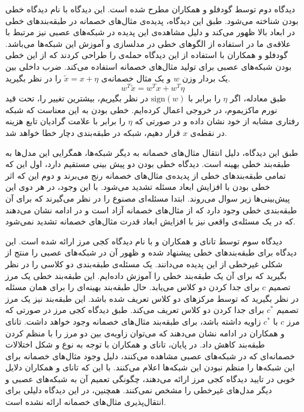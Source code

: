 \documentclass[12pt,onecolumn,a4paper]{article}
\begin{document}
دیدگاه دوم توسط گودفلو و همکاران\cite{goodfellow2014explaining}
مطرح شده است. این دیدگاه با نام دیدگاه خطی بودن شناخته می‌شود. طبق این دیدگاه، پدیده‌ی مثال‌های خصمانه در طبقه‌بندهای خطی در ابعاد بالا ظهور می‌کند و دلیل مشاهده‌ی این پدیده در شبکه‌های عصبی نیز مرتبط با علاقه‌ی ما در استفاده از الگوهای خطی در مدلسازی و آموزش این شبکه‌ها می‌باشد. گودفلو و همکاران با استفاده از این دیدگاه حمله‌ی
را طراحی کردند که از این خطی بودن شبکه‌های عصبی برای تولید مثال‌های خصمانه استفاده می‌کند. ضرب داخلی بین یک بردار وزن $w$ و یک مثال خصمانه‌ی $\tilde{x}=x+\eta$ را در نظر بگیرید.
\begin{equation*}
w^T\tilde{x}=w^Tx+w^T\eta
\end{equation*}
طبق معادله، اگر $\eta$ را برابر با $\mathrm{sign}(w)$ در نظر بگیریم، بیشترین تغییر را، تحت قید نورم ماکزیموم، در خروجی اعمال کرده‌ایم. خطی بودن به این معناست که شبکه رفتاری مشابه از خود نشان داده و در صورتی که $\eta$ را برابر با علامت گرادیان تابع هزینه در نقطه‌ی $x$ قرار دهیم، شبکه در طبقه‌بندی دچار خطا خواهد شد.

طبق این دیدگاه، دلیل انتقال مثال‌های خصمانه به دیگر شبکه‌ها، همگرایی این مدل‌ها به طبقه‌بند خطی بهینه است. دیدگاه خطی بودن دو پیش بینی مستقیم دارد، اول این که تمامی طبقه‌بندهای خطی از پدیده‌ی مثال‌های خصمانه رنج می‌برند و دوم این که اثر خطی بودن با افزایش ابعاد مسئله تشدید می‌شود. با این وجود، در
\cite{tanay2016boundary}
هر دوی این پیش‌بینی‌ها زیر سوال می‌روند. ابتدا مسئله‌ای  مصنوع را در نظر می‌گیرند که برای آن طبقه‌بندی خطی وجود دارد که از مثال‌های خصمانه آزاد است و در ادامه نشان می‌دهند که در یک مسئله‌ی واقعی نیز با افزایش ابعاد قدرت مثال‌های خصمانه تشدید نمی‌شود.

دیدگاه سوم توسط تانای و همکاران
\cite{tanay2016boundary}
 و با نام دیدگاه کجی مرز ارائه شده است. این دیدگاه برای طبقه‌بندهای خطی پیشنهاد شده و ظهور آن در شبکه‌های عصبی را منتج از شکلی غیرخطی از این پدیده می‌دانند. یک مسئله‌ی طبقه‌بندی دو کلاسی را در نظر بگیرید که برای آن یک طبقه‌بند خطی را آموزش داده‌ایم. این طبقه‌بند خطی یک مرز تصمیم
 $c$
 برای جدا کردن دو کلاس می‌یابد. حال طبقه‌بند بهینه‌ای را برای همان مسئله در نظر بگیرید که توسط مرکزهای دو کلاس تعریف شده باشد. این طبقه‌بند نیز یک مرز تصمیم
 $c^*$
 برای جدا کردن دو کلاس تعریف می‌کند. طبق دیدگاه کجی مرز در صورتی که مرز
 $c$
 با
 $c^*$
 زاویه داشته باشد، برای طبقه‌بند مثال‌های خصمانه وجود خواهد داشت. تانای و همکاران در ادامه نشان می‌دهند که می‌توان زاویه‌ی بین دو مرز را با منظم کردن
طبقه‌بند کاهش داد. در پایان، تانای و همکاران با توجه به نوع و شکل اختلالات خصمانه‌ای که در شبکه‌های عصبی مشاهده می‌کنند، دلیل وجود مثال‌های خصمانه برای این شبکه‌ها را منظم نبودن این شبکه‌ها اعلام می‌کنند. با این که تانای و همکاران دلایل خوبی در تایید دیدگاه کجی مرز ارائه می‌دهند، چگونگی تعمیم آن به شبکه‌های عصبی و دیگر مدل‌های غیرخطی را مشخص نمی‌کنند. همچنین، در این دیدگاه دلیلی برای انتقال‌پذیری مثال‌های خصمانه ارائه نشده است.
\end{document}
